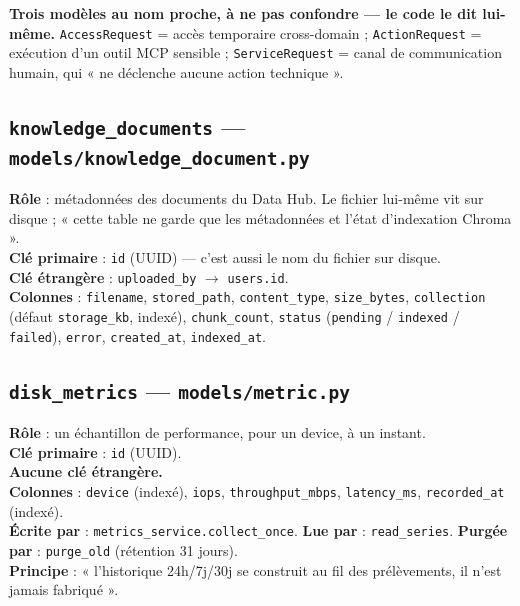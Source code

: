 \documentclass[11pt,a4paper]{report}
\newcommand{\file}[1]{\texttt{\small #1}}
\newcommand{\fn}[1]{\texttt{\small\textcolor{oasisviolet}{#1}}}
\newcommand{\cls}[1]{\texttt{\small\textcolor{oasisblue}{#1}}}
\newcommand{\tbl}[1]{\texttt{\small\textcolor{oasisamber}{#1}}}
\newcommand{\arrowto}{\ensuremath{\rightarrow}}
\begin{document}
\begin{infobox}
\textbf{Trois modèles au nom proche, à ne pas confondre --- le code le dit
lui-même.} \cls{AccessRequest} = accès temporaire cross-domain ;
\cls{ActionRequest} = exécution d'un outil MCP sensible ;
\cls{ServiceRequest} = canal de communication humain, qui « ne déclenche aucune
action technique ».
\end{infobox}

\subsection{\tbl{knowledge\_documents} --- \file{models/knowledge\_document.py}}

\textbf{Rôle} : métadonnées des documents du Data Hub. Le fichier lui-même vit
sur disque ; « cette table ne garde que les métadonnées et l'état d'indexation
Chroma ».\\
\textbf{Clé primaire} : \texttt{id} (UUID) --- c'est aussi le nom du fichier sur
disque.\\
\textbf{Clé étrangère} : \texttt{uploaded\_by} \arrowto{} \texttt{users.id}.\\
\textbf{Colonnes} : \texttt{filename}, \texttt{stored\_path},
\texttt{content\_type}, \texttt{size\_bytes}, \texttt{collection} (défaut
\texttt{storage\_kb}, indexé), \texttt{chunk\_count}, \texttt{status}
(\texttt{pending} / \texttt{indexed} / \texttt{failed}), \texttt{error},
\texttt{created\_at}, \texttt{indexed\_at}.

\subsection{\tbl{disk\_metrics} --- \file{models/metric.py}}

\textbf{Rôle} : un échantillon de performance, pour un device, à un instant.\\
\textbf{Clé primaire} : \texttt{id} (UUID).\\
\textbf{Aucune clé étrangère.}\\
\textbf{Colonnes} : \texttt{device} (indexé), \texttt{iops},
\texttt{throughput\_mbps}, \texttt{latency\_ms}, \texttt{recorded\_at} (indexé).\\
\textbf{Écrite par} : \fn{metrics\_service.collect\_once}.
\textbf{Lue par} : \fn{read\_series}. \textbf{Purgée par} : \fn{purge\_old}
(rétention 31 jours).\\
\textbf{Principe} : « l'historique 24h/7j/30j se construit au fil des
prélèvements, il n'est jamais fabriqué ».
\end{document}
